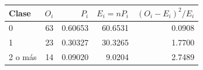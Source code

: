 \begin{tabular}{lrrrr}
\toprule
\textbf{Clase} & \textbf{$O_i$} & \textbf{$P_i$} & \textbf{$E_i=nP_i$} & \textbf{$(O_i-E_i)^2/E_i$} \\ \midrule
0 & 63 & 0.60653 & 60.6531 & 0.0908 \\
1 & 23 & 0.30327 & 30.3265 & 1.7700 \\
2 o más & 14 & 0.09020 & 9.0204 & 2.7489 \\
\bottomrule
\end{tabular}